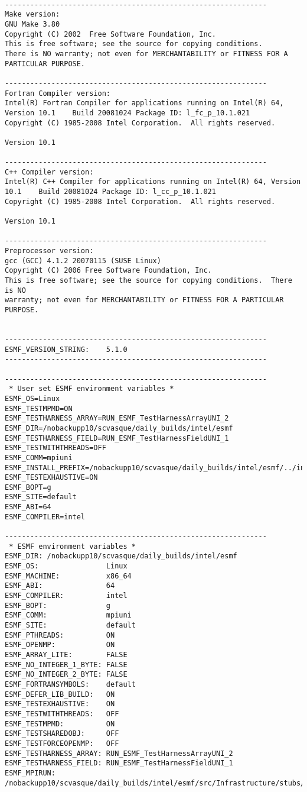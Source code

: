 \begin{verbatim}

--------------------------------------------------------------
Make version:
GNU Make 3.80
Copyright (C) 2002  Free Software Foundation, Inc.
This is free software; see the source for copying conditions.
There is NO warranty; not even for MERCHANTABILITY or FITNESS FOR A
PARTICULAR PURPOSE.

--------------------------------------------------------------
Fortran Compiler version:
Intel(R) Fortran Compiler for applications running on Intel(R) 64, Version 10.1    Build 20081024 Package ID: l_fc_p_10.1.021
Copyright (C) 1985-2008 Intel Corporation.  All rights reserved.

Version 10.1 

--------------------------------------------------------------
C++ Compiler version:
Intel(R) C++ Compiler for applications running on Intel(R) 64, Version 10.1    Build 20081024 Package ID: l_cc_p_10.1.021
Copyright (C) 1985-2008 Intel Corporation.  All rights reserved.

Version 10.1 

--------------------------------------------------------------
Preprocessor version:
gcc (GCC) 4.1.2 20070115 (SUSE Linux)
Copyright (C) 2006 Free Software Foundation, Inc.
This is free software; see the source for copying conditions.  There is NO
warranty; not even for MERCHANTABILITY or FITNESS FOR A PARTICULAR PURPOSE.


--------------------------------------------------------------
ESMF_VERSION_STRING:    5.1.0
--------------------------------------------------------------
 
--------------------------------------------------------------
 * User set ESMF environment variables *
ESMF_OS=Linux
ESMF_TESTMPMD=ON
ESMF_TESTHARNESS_ARRAY=RUN_ESMF_TestHarnessArrayUNI_2
ESMF_DIR=/nobackupp10/scvasque/daily_builds/intel/esmf
ESMF_TESTHARNESS_FIELD=RUN_ESMF_TestHarnessFieldUNI_1
ESMF_TESTWITHTHREADS=OFF
ESMF_COMM=mpiuni
ESMF_INSTALL_PREFIX=/nobackupp10/scvasque/daily_builds/intel/esmf/../install_dir
ESMF_TESTEXHAUSTIVE=ON
ESMF_BOPT=g
ESMF_SITE=default
ESMF_ABI=64
ESMF_COMPILER=intel
 
--------------------------------------------------------------
 * ESMF environment variables *
ESMF_DIR: /nobackupp10/scvasque/daily_builds/intel/esmf
ESMF_OS:                Linux
ESMF_MACHINE:           x86_64
ESMF_ABI:               64
ESMF_COMPILER:          intel
ESMF_BOPT:              g
ESMF_COMM:              mpiuni
ESMF_SITE:              default
ESMF_PTHREADS:          ON
ESMF_OPENMP:            ON
ESMF_ARRAY_LITE:        FALSE
ESMF_NO_INTEGER_1_BYTE: FALSE
ESMF_NO_INTEGER_2_BYTE: FALSE
ESMF_FORTRANSYMBOLS:    default
ESMF_DEFER_LIB_BUILD:   ON
ESMF_TESTEXHAUSTIVE:    ON
ESMF_TESTWITHTHREADS:   OFF
ESMF_TESTMPMD:          ON
ESMF_TESTSHAREDOBJ:     OFF
ESMF_TESTFORCEOPENMP:   OFF
ESMF_TESTHARNESS_ARRAY: RUN_ESMF_TestHarnessArrayUNI_2
ESMF_TESTHARNESS_FIELD: RUN_ESMF_TestHarnessFieldUNI_1
ESMF_MPIRUN:            /nobackupp10/scvasque/daily_builds/intel/esmf/src/Infrastructure/stubs/mpiuni/mpirun
 

\end{verbatim}
